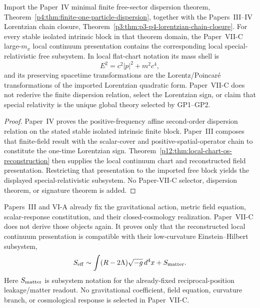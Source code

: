 \documentclass[12pt,a4paper]{article}
\begin{document}
\begin{corollary}
\label{p12:prop:sr-subsystem}
Import the Paper~IV minimal finite free-sector dispersion theorem,
Theorem~\ref{p4:thm:finite-one-particle-dispersion}, together with the
Papers~III--IV Lorentzian chain closure,
Theorem~\ref{p3:thm:p3-p4-lorentzian-chain-closure}.  For every stable isolated
intrinsic block in that theorem domain, the Paper~VII-C large-\(m_x\) local
continuum presentation contains the corresponding local special-relativistic
free subsystem.  In local flat-chart notation its mass shell is
\[
E^2=c^2|p|^2+m^2c^4,
\]
and its preserving spacetime transformations are the Lorentz/Poincar\'e
transformations of the imported Lorentzian quadratic form.  Paper~VII-C does not
rederive the finite dispersion relation, select the Lorentzian sign, or claim
that special relativity is the unique global theory selected by GP1--GP2.
\end{corollary}

\begin{proof}
Paper~IV proves the positive-frequency affine second-order dispersion relation
on the stated stable isolated intrinsic finite block.  Paper~III composes that
finite-field result with the scalar-cover and positive-spatial-operator chain
to constitute the one-time Lorentzian sign.  Theorem~\ref{p12:thm:local-chart-os-reconstruction}
then supplies the local continuum chart and reconstructed field presentation.
Restricting that presentation to the imported free block yields the displayed
special-relativistic subsystem.  No Paper-VII-C selector, dispersion theorem, or
signature theorem is added.
\end{proof}

\begin{proposition}
\label{p12:prop:gr-subsystem}
Papers~III and VI-A already fix the gravitational action, metric field equation, scalar-response constitution, and their closed-cosmology realization.  Paper~VII-C does not derive those objects again.  It proves only that the reconstructed local continuum presentation is compatible with their low-curvature Einstein--Hilbert subsystem,
\[
S_{\rm eff}
\sim
\int (R-2\Lambda)\sqrt{-g}\,d^4x
+
S_{\rm matter}.
\]
Here \(S_{\rm matter}\) is subsystem notation for the already-fixed reciprocal-position leakage/matter readout.  No gravitational coefficient, field equation, curvature branch, or cosmological response is selected in Paper~VII-C.
\end{proposition}
\end{document}
